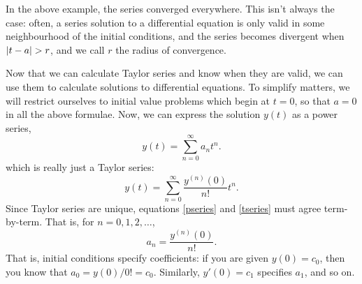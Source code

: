 \documentclass[10pt,driverfallback=hypertex]{report}
\begin{document}
In the above example, the series converged everywhere. This isn't always
the case: often, a series solution to a differential equation is only
valid in some neighbourhood of the initial conditions, and the series
becomes divergent when $\left|t-a\right| > r$, and we call $r$ the radius of
convergence.

%

Now that we can calculate Taylor series and know when they are valid,
we can use them to calculate solutions to differential equations. To
simplify matters, we will restrict ourselves to initial value problems
which begin at $t=0$, so that $a=0$ in all the above formulae. Now, we
can express the solution $y(t)$ as a power series,
\begin{dmath}
  \label{pseries}
  y(t) = \sum_{n=0}^\infty a_n t^n .
\end{dmath}
which is really just a Taylor series:
\begin{dmath}
  \label{tseries}
  y(t) = \sum_{n=0}^\infty \frac{y^{(n)}(0)}{n!} t^n .
\end{dmath}
Since Taylor series are unique, equations \eqref{pseries} and
\eqref{tseries} must agree term-by-term.  That is, for $n=0,1,2,\dots$,
\begin{dmath*}
  a_n = \frac{y^{(n)}(0)}{n!}.
\end{dmath*}
That is, initial conditions specify coefficients: if you are given
$y(0)=c_0$, then you know that $a_0 = y(0)/0! = c_0$. Similarly, $y'(0)=c_1$
specifies $a_1$, and so on.
\end{document}
